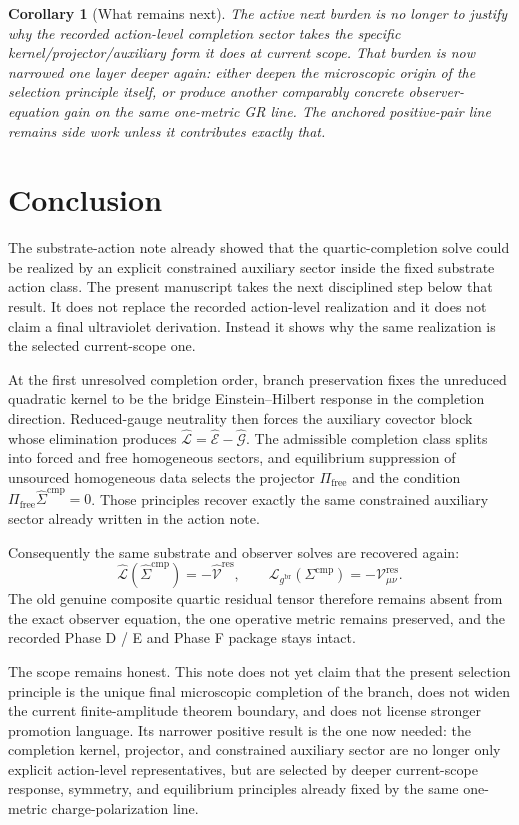 \documentclass[11pt]{article}
\newcommand{\ObserverMetric}{g^{\mathrm{br}}}
\newcommand{\CompShift}{\Sigma^{\mathrm{cmp}}}
\newcommand{\CompLift}{\widehat\Sigma^{\mathrm{cmp}}}
\newcommand{\ResidualCore}{\mathcal V_{\mu\nu}^{\mathrm{res}}}
\newcommand{\ResidualLift}{\widehat{\mathcal V}^{\mathrm{res}}}
\newcommand{\SubEinLin}{\widehat{\mathcal E}}
\newcommand{\SubGaugeBook}{\widehat{\mathcal G}}
\newcommand{\SubReducedEin}{\widehat{\mathcal L}}
\newcommand{\FreeProj}{\Pi_{\mathrm{free}}}
\newcommand{\ReducedEin}{\mathcal L_{\ObserverMetric}}
\newtheorem{corollary}{Corollary}
\begin{document}
\begin{corollary}[What remains next]
The active next burden is no longer to justify why the recorded action-level completion sector takes the specific kernel/projector/auxiliary form it does at current scope. That burden is now narrowed one layer deeper again: either deepen the microscopic origin of the selection principle itself, or produce another comparably concrete observer-equation gain on the same one-metric GR line. The anchored positive-pair line remains side work unless it contributes exactly that.
\end{corollary}

\section{Conclusion}

The substrate-action note already showed that the quartic-completion solve could be realized by an explicit constrained auxiliary sector inside the fixed substrate action class. The present manuscript takes the next disciplined step below that result. It does not replace the recorded action-level realization and it does not claim a final ultraviolet derivation. Instead it shows why the same realization is the selected current-scope one.

At the first unresolved completion order, branch preservation fixes the unreduced quadratic kernel to be the bridge Einstein--Hilbert response in the completion direction. Reduced-gauge neutrality then forces the auxiliary covector block whose elimination produces \(\SubReducedEin=\SubEinLin-\SubGaugeBook\). The admissible completion class splits into forced and free homogeneous sectors, and equilibrium suppression of unsourced homogeneous data selects the projector \(\FreeProj\) and the condition \(\FreeProj\CompLift=0\). Those principles recover exactly the same constrained auxiliary sector already written in the action note.

Consequently the same substrate and observer solves are recovered again:
\[
\SubReducedEin(\CompLift)=-\ResidualLift,
\qquad
\ReducedEin(\CompShift)=-\ResidualCore.
\]
The old genuine composite quartic residual tensor therefore remains absent from the exact observer equation, the one operative metric remains preserved, and the recorded Phase D / E and Phase F package stays intact.

The scope remains honest. This note does not yet claim that the present selection principle is the unique final microscopic completion of the branch, does not widen the current finite-amplitude theorem boundary, and does not license stronger promotion language. Its narrower positive result is the one now needed: the completion kernel, projector, and constrained auxiliary sector are no longer only explicit action-level representatives, but are selected by deeper current-scope response, symmetry, and equilibrium principles already fixed by the same one-metric charge-polarization line.
\end{document}
